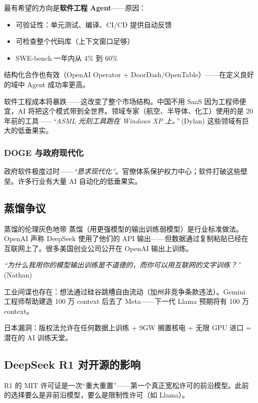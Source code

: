 最有希望的方向是\textbf{软件工程 Agent}——原因：
\begin{itemize}
    \item 可验证性：单元测试、编译、CI/CD 提供自动反馈
    \item 可检查整个代码库（上下文窗口足够）
    \item SWE-bench 一年内从 4\% 到 60\%
\end{itemize}

结构化合作也有效（OpenAI Operator + DoorDash/OpenTable）——在定义良好的域中 Agent 成功率更高。

软件工程成本将暴跌——这改变了整个市场结构。中国不用 SaaS 因为工程师便宜，AI 将把这个模式带到全世界。领域专家（航空、半导体、化工）使用的是 20 年前的工具——\textit{``ASML 光刻工具跑在 Windows XP 上。''} (Dylan) 这些领域有巨大的低垂果实。

\subsubsection{DOGE 与政府现代化}

政府软件极度过时——\textit{``恳求现代化''}。官僚体系保护权力中心；软件打破这些壁垒。许多行业有大量 AI 自动化的低垂果实。

\subsection{蒸馏争议}

\begin{knowledgebox}{蒸馏的伦理灰色地带}
蒸馏（用更强模型的输出训练弱模型）是行业标准做法。OpenAI 声称 DeepSeek 使用了他们的 API 输出——但数据通过复制粘贴已经在互联网上了。很多美国创业公司公开在 OpenAI 输出上训练。

\textit{``为什么我用你的模型输出训练是不道德的，而你可以用互联网的文字训练？''} (Nathan)

工业间谍也存在：想法通过硅谷跳槽自由流动（加州非竞争条款违法）。Gemini 工程师帮助建造 100 万 context 后去了 Meta——下一代 Llama 预期将有 100 万 context。

日本漏洞：版权法允许在任何数据上训练 + 9GW 搁置核电 + 无限 GPU 进口 = 潜在的 AI 训练天堂。
\end{knowledgebox}

\subsection{DeepSeek R1 对开源的影响}

R1 的 MIT 许可证是一次``重大重置''——第一个真正宽松许可的前沿模型。此前的选择要么是非前沿模型，要么是限制性许可（如 Llama）。

